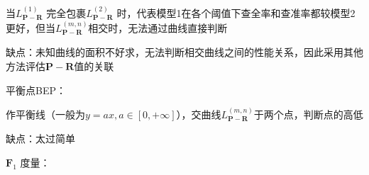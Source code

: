 \begin{notation}
    当$L_{\bm{P}-\bm{R}}^{(1)}$ 完全包裹$L_{\bm{P}-\bm{R}}^{(2)}$ 时，代表模型1在各个阈值下查全率和查准率都较模型2更好，但当$L_{\bm{P}-\bm{R}}^{(m,n)}$相交时，无法通过曲线直接判断
\end{notation}
缺点：未知曲线的面积不好求，无法判断相交曲线之间的性能关系，因此采用其他方法评估$\bm{P}-\bm{R}$值的关联
\begin{notation}
    平衡点BEP：

    作平衡线（一般为$y=ax,a\in [0,+\infty ]$），交曲线$L_{\bm{P}-\bm{R}}^{(m,n)}$于两个点，判断点的高低

    缺点：太过简单
\end{notation}
\begin{notation}
    $\bm{F}_1$ 度量：

\end{notation}

